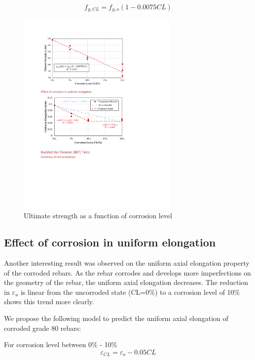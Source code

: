 \begin{equation}
    f_{y,CL} = f_{y,o}(1-0.0075CL)
    \label{eq.Calderon_Fu_vs_CL}
\end{equation}

\begin{figure}[htbp]
	\centering
	\includegraphics[width=0.7\textwidth]{VAC Thesis 2.0/Chapter-4/figs/TensionTest_results_5_UltimateStrength.pdf}
	\caption{Ultimate strength as a function of corrosion level}
	\label{fig:Calderon_ultimate_strength}
\end{figure}

\subsection{Effect of corrosion in uniform elongation}

Another interesting result was observed on the uniform axial elongation property of the corroded rebars. As the rebar corrodes and develops more imperfections on the geometry of the rebar, the uniform axial elongation decreases. The reduction in $\varepsilon_{u}$ is linear from the uncorroded state (CL=0\%) to a corrosion level of 10\%  shows this trend more clearly. 

We propose the following model to predict the uniform axial elongation of corroded grade 80 rebars:

For corrosion level between 0\% - 10\%
\begin{equation}
    \varepsilon_{CL} = \varepsilon_{o}-0.05CL
    \label{eq.Calderon_UAE_vs_CL}
\end{equation}

